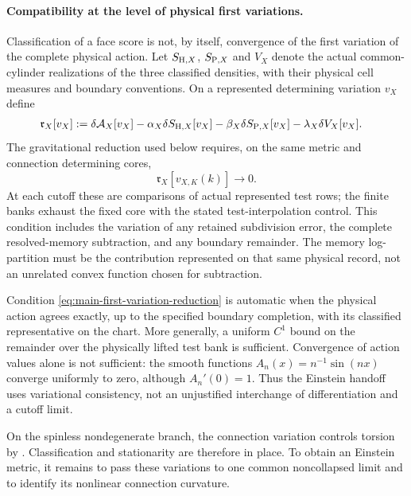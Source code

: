 \documentclass[11pt]{article}
\numberwithin{equation}{section}
\theoremstyle{definition}
\theoremstyle{remark}
\begin{document}
\paragraph{Compatibility at the level of physical first variations.}
Classification of a face score is not, by itself, convergence of the first
variation of the complete physical action. Let $S_{{\rm H},X}$,
$S_{{\rm P},X}$ and $V_X$ denote the actual common-cylinder realizations of
the three classified densities, with their physical cell measures and
boundary conventions. On a represented determining variation $v_X$ define
\begin{equation}
 \begin{split}
 \mathfrak r_X[v_X]:={}&\delta\mathcal A_X[v_X]
  -\alpha_X\delta S_{{\rm H},X}[v_X]
  -\beta_X\delta S_{{\rm P},X}[v_X]
  -\lambda_X\delta V_X[v_X].
 \end{split}
 \label{eq:main-action-variation-remainder}
\end{equation}
The gravitational reduction used below requires, on the same metric and
connection determining cores,
\begin{equation}
 \mathfrak r_X[v_{X,K}(k)]\longrightarrow0.
 \label{eq:main-first-variation-reduction}
\end{equation}
At each cutoff these are comparisons of actual represented test rows; the
finite banks exhaust the fixed core with the stated test-interpolation
control. This condition includes the variation of any retained subdivision
error, the complete resolved-memory subtraction, and any boundary remainder.
The memory log-partition must be the contribution represented on that same
physical record, not an unrelated convex function chosen for subtraction.

Condition \eqref{eq:main-first-variation-reduction} is automatic when the
physical action agrees exactly, up to the specified boundary completion,
with its classified representative on the chart. More generally, a uniform
$C^1$ bound on the remainder over the physically lifted test bank is
sufficient. Convergence of action values alone is not sufficient: the smooth
functions $A_n(x)=n^{-1}\sin(nx)$ converge uniformly to zero, although
$A_n'(0)=1$. Thus the Einstein handoff uses variational consistency, not an
unjustified interchange of differentiation and a cutoff limit.


On the spinless nondegenerate branch, the connection variation controls
torsion by . Classification and stationarity
are therefore in place. To obtain an Einstein metric, it remains to pass
these variations to one common noncollapsed limit and to identify its
nonlinear connection curvature.
\end{document}
